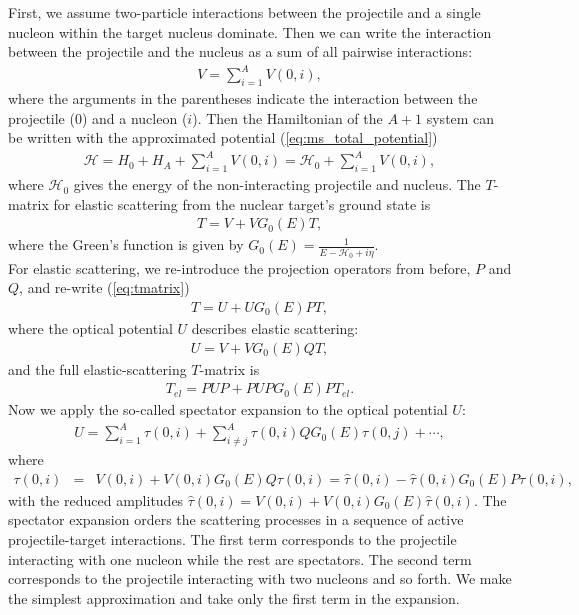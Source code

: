 \documentclass[preprintnumbers,floatfix,aps,prc,preprint,nofootinbib]{revtex4-1}
\begin{document}
First, we assume two-particle interactions between the projectile and a single nucleon within the target nucleus dominate. Then we can write the interaction between the projectile and the nucleus as a sum of all pairwise interactions:
%
\begin{eqnarray}
	\label{eq:ms_total_potential}
	V = \sum_{i=1}^A V(0, i),
\end{eqnarray}
%
where the arguments in the parentheses indicate the interaction between the projectile ($0$) and a nucleon ($i$). Then the Hamiltonian of the $A+1$ system can be written with the approximated potential (\ref{eq:ms_total_potential})
%
\begin{eqnarray}
	\label{eq:ms_hamiltonian}
	\mathcal{H} = H_0 + H_A + \sum_{i=1}^A V(0, i) = \mathcal{H}_0 + \sum_{i=1}^A V(0, i),
\end{eqnarray}
%
where $\mathcal{H}_0$ gives the energy of the non-interacting projectile and nucleus. The $T$-matrix for elastic scattering from the nuclear target's ground state is
%
\begin{eqnarray}
	\label{eq:tmatrix}
	T = V + V G_0(E) T,
\end{eqnarray}
%
where the Green's function is given by $G_0(E) = \frac{1}{E - \mathcal{H}_0 + i \eta}$.
\\

For elastic scattering, we re-introduce the projection operators from before, $P$ and $Q$, and re-write (\ref{eq:tmatrix})
%
\begin{eqnarray}
	\label{eq:tmatrix_elastic}
	T = U + U G_0(E) P T,
\end{eqnarray}
%
where the optical potential $U$ describes elastic scattering:
%
\begin{eqnarray}
	\label{eq:ms_optical_potential_elastic}
	U = V + V G_0(E) Q T,
\end{eqnarray}
%
and the full elastic-scattering $T$-matrix is
%
\begin{eqnarray}
	\label{eq:tmatrix_full_elastic}
	T_{el} = P U P + P U P G_0(E) P T_{el}.
\end{eqnarray}
%
Now we apply the so-called spectator expansion to the optical potential $U$:
%
\begin{eqnarray}
	\label{eqn:spec_exp}
	U = \sum_{i=1}^A \tau(0, i) + \sum_{i \neq j}^A \tau(0, i) Q G_0(E) \tau(0, j) + \cdots,
\end{eqnarray}
%
where
\begin{eqnarray}
	\label{eq:tau_equations}
	\tau(0, i) &=& V(0, i) + V(0, i) G_0(E) Q \tau(0, i) = \hat{\tau}(0, i) - \hat{\tau}(0, i) G_0(E) P \tau(0, i),
\end{eqnarray}
%
with the reduced amplitudes $\hat{\tau}(0, i) = V(0, i) + V(0, i) G_0(E) \hat{\tau}(0, i)$. The spectator expansion orders the scattering processes in a sequence of active projectile-target interactions. The first term corresponds to the projectile interacting with one nucleon while the rest are spectators. The second term corresponds to the projectile interacting with two nucleons and so forth. We make the simplest approximation and take only the first term in the expansion.
\\
\end{document}
